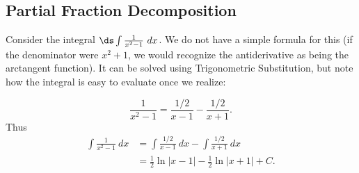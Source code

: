 %
%



\subsection{Partial Fraction Decomposition}\label{sec:partial_fraction}


Consider the integral $\ds\int \frac{1}{x^2-1}\ dx$. We do not have a simple formula for this (if the denominator were $x^2+1$, we would recognize the antiderivative as being the arctangent function). It can be solved using Trigonometric Substitution, but note how the integral is easy to evaluate once we realize:

$$\frac{1}{x^2-1} = \frac{1/2}{x-1} - \frac{1/2}{x+1}.$$
Thus 
\begin{align*}
\int\frac{1}{x^2-1}\ dx &= \int\frac{1/2}{x-1}\ dx - \int\frac{1/2}{x+1}\ dx \\
			&= \frac12\ln|x-1| - \frac12\ln|x+1| + C.
\end{align*}


